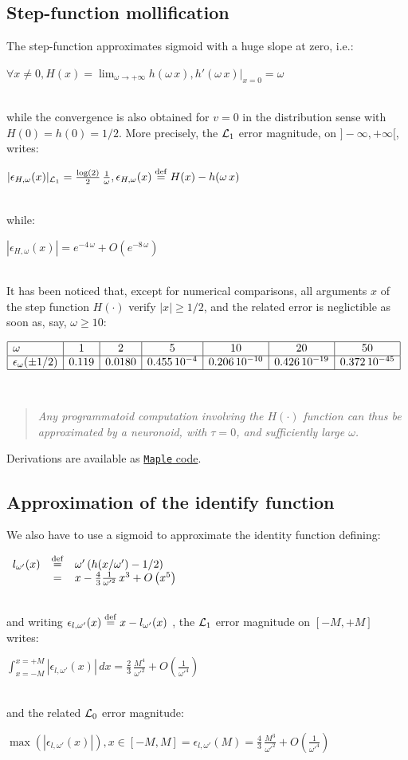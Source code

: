 \documentclass[a4]{article}
\newcommand{\eqline}[1]{~\vspace{0.1cm}\\\centerline{$#1$}\vspace{0.1cm}\\}
\newcommand{\defq}{\stackrel {\rm def}{=}}
\begin{document}
\subsection{Step-function mollification}

The step-function approximates sigmoid with a huge slope at zero, i.e.:
\eqline{\forall x \ne 0, H(x) = \lim_{\omega  \rightarrow +\infty} h(\omega \, x), \left. h'(\omega \, x)  \right|_{x = 0} =  \omega}
while the convergence is also obtained for $v=0$ in the distribution sense with $H(0) = h(0) = 1/2$.
More precisely, the ${\cal L}_1$ error magnitude, on $]-\infty, +\infty[$, writes:
\eqline{|\epsilon_{H,\omega}(x) |_{{\cal L}_1} = \frac{\log(2)}{2} \, \frac{1}{\omega}, \epsilon_{H,\omega}(x) \defq H(x) - h(\omega \, x)}
while:
\eqline{|\epsilon_{H,\omega}(x)| = e^{-4\,\omega}+O\left(e^{-8\,\omega}\right)}

It has been noticed that, except for numerical comparisons, all arguments $x$ of the step function $H(\cdot)$ verify $|x| \ge 1/2$, and the related error is neglictible as soon as, say, $\omega \ge 10$:
\eqline{\begin{array}{|l|c|c|c|c|c|c|} \hline
  \omega & 1 & 2 & 5 & 10 & 20 & 50 \\ \hline
  \epsilon_\omega(\pm1/2) & 0.119 &  0.0180 &  0.455 \, 10^{-4} &  0.206 \, 10^{-10} &  0.426 \, 10^{-19} &  0.372 \, 10^{-45} \\ \hline
\end{array}}

\begin{quotation}
{\em Any programmatoid  computation involving the $H(\cdot)$ function can thus be approximated by a neuronoid, with $\tau = 0$, and sufficiently large $\omega$.}
\end{quotation}
  
Derivations are available as \href{https://raw.githubusercontent.com/vthierry/braincraft/master/doc/tex/mollificatio.mpl.out.txt}{{\tt Maple} code}.

\subsection{Approximation of the identify function}

We also have to use a sigmoid to approximate the identity function defining:
\eqline{\begin{array}{rcl}
   l_{\omega'}(x) &\defq& \omega' \, (h(x/\omega') - 1/2) \\
   &=& x -\frac{4}{3} \frac{1}{\omega'^2} \, x^3 + O\left(x^5\right) \\
\end{array}}   
and writing $\epsilon_{l,\omega'}(x) \defq x - l_{\omega'}(x)$ , the ${\cal L}_1$ error magnitude on $[-M, +M]$ writes:
\eqline{\int_{x=-M}^{x=+M}|\epsilon_{l,\omega'}(x)| \, dx = \frac{2}{3} \, \frac{M^4}{\omega'^2} + O\left(\frac{1}{\omega'^4}\right)}
and the related ${\cal L}_0$ error magnitude:
\eqline{\max(|\epsilon_{l,\omega'}(x)|), x \in [-M, M] = \epsilon_{l,\omega'}(M)  = \frac{4}{3} \, \frac{M^3}{\omega'^2} + O\left(\frac{1}{\omega'^4}\right)}
\end{document}
